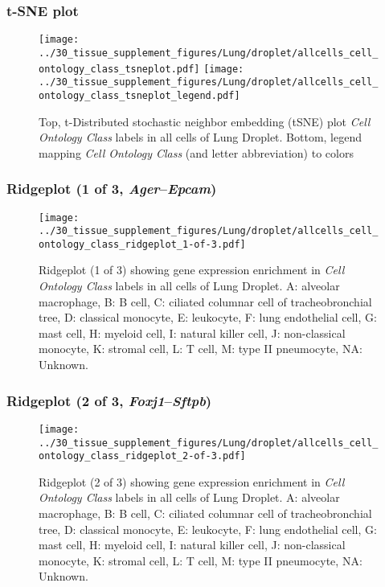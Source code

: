 \clearpage
\subsubsection{t-SNE plot}
\begin{figure}[h]
\centering
\texttt{[image: ../30\_tissue\_supplement\_figures/Lung/droplet/allcells\_cell\_ontology\_class\_tsneplot.pdf]}
\texttt{[image: ../30\_tissue\_supplement\_figures/Lung/droplet/allcells\_cell\_ontology\_class\_tsneplot\_legend.pdf]}
\caption{Top, t-Distributed stochastic neighbor embedding (tSNE) plot  \emph{Cell Ontology Class} labels in all cells of Lung Droplet. Bottom, legend mapping \emph{Cell Ontology Class} (and letter abbreviation) to colors}
\end{figure}


\clearpage

\subsubsection{Ridgeplot (1 of 3, \emph{Ager}--\emph{Epcam})}
\begin{figure}[h]
\centering
\texttt{[image: ../30\_tissue\_supplement\_figures/Lung/droplet/allcells\_cell\_ontology\_class\_ridgeplot\_1-of-3.pdf]}

\caption{ Ridgeplot (1 of 3)  showing gene expression enrichment in \emph{Cell Ontology Class} labels in all cells of Lung Droplet. A: alveolar macrophage, B: B cell, C: ciliated columnar cell of tracheobronchial tree, D: classical monocyte, E: leukocyte, F: lung endothelial cell, G: mast cell, H: myeloid cell, I: natural killer cell, J: non-classical monocyte, K: stromal cell, L: T cell, M: type II pneumocyte, NA: Unknown.}
\end{figure}


\clearpage

\subsubsection{Ridgeplot (2 of 3, \emph{Foxj1}--\emph{Sftpb})}
\begin{figure}[h]
\centering
\texttt{[image: ../30\_tissue\_supplement\_figures/Lung/droplet/allcells\_cell\_ontology\_class\_ridgeplot\_2-of-3.pdf]}

\caption{ Ridgeplot (2 of 3)  showing gene expression enrichment in \emph{Cell Ontology Class} labels in all cells of Lung Droplet. A: alveolar macrophage, B: B cell, C: ciliated columnar cell of tracheobronchial tree, D: classical monocyte, E: leukocyte, F: lung endothelial cell, G: mast cell, H: myeloid cell, I: natural killer cell, J: non-classical monocyte, K: stromal cell, L: T cell, M: type II pneumocyte, NA: Unknown.}
\end{figure}


